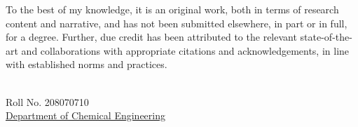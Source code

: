 \documentclass[11pt, a4paper, oneside]{Thesis} %
\begin{document}
To the best of my knowledge, it is an original work, both in terms of research content and narrative, and has not been submitted elsewhere, in part or in full, for a degree. Further, due credit has been attributed to the relevant state-of-the-art and collaborations with appropriate citations and acknowledgements, in line with established norms and practices.\\ [2cm]
\begin{minipage}{.5\textwidth}
		\begin{flushleft}
			{\authornames\\ Roll No. 208070710 \\
			\normalsize{\href{http://www.iitk.ac.in/che}{Department of Chemical Engineering}\\
			\univname}}
		\end{flushleft}
\end{minipage}
\vfill

\clearpage %

\end{document}
